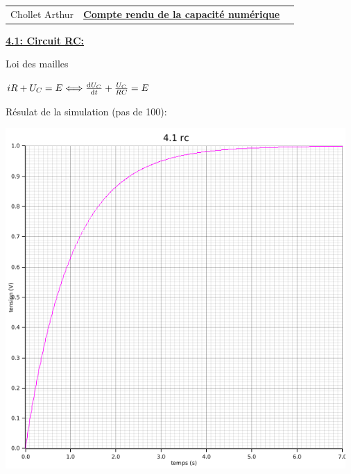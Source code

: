 \documentclass{article}
\newcommand{\expart}[1]
{
    \textbf{\underline{#1:}} \par 
}
\begin{document}
\begin{tabularx}{\linewidth}{XCX}
    Chollet Arthur &\textbf{\underline{Compte rendu de la capacité numérique}}& 
\end{tabularx}

\expart{4.1: Circuit RC}
{
    Loi des mailles

    $iR+U_C=E \Longleftrightarrow  \dv{U_C}{t}+\frac{U_C}{RC}=E$

    Résulat de la simulation (pas de 100):

    \begin{center}
      \includegraphics[height=35em]{images/rc}
    \end{center}
}

\pagebreak
\end{document}
